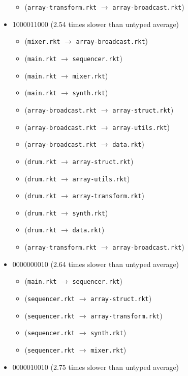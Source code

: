 \documentclass{article}
\newcommand{\mono}[1]{\texttt{#1}}
\begin{document}
\begin{itemize}
\begin{itemize}
  \item (\mono{array-transform.rkt} $\rightarrow$ \mono{array-broadcast.rkt})
  \end{itemize}
\item 1000011000 (2.54 times slower than untyped average)
  \begin{itemize}
  \item (\mono{mixer.rkt} $\rightarrow$ \mono{array-broadcast.rkt})
  \item (\mono{main.rkt} $\rightarrow$ \mono{sequencer.rkt})
  \item (\mono{main.rkt} $\rightarrow$ \mono{mixer.rkt})
  \item (\mono{main.rkt} $\rightarrow$ \mono{synth.rkt})
  \item (\mono{array-broadcast.rkt} $\rightarrow$ \mono{array-struct.rkt})
  \item (\mono{array-broadcast.rkt} $\rightarrow$ \mono{array-utils.rkt})
  \item (\mono{array-broadcast.rkt} $\rightarrow$ \mono{data.rkt})
  \item (\mono{drum.rkt} $\rightarrow$ \mono{array-struct.rkt})
  \item (\mono{drum.rkt} $\rightarrow$ \mono{array-utils.rkt})
  \item (\mono{drum.rkt} $\rightarrow$ \mono{array-transform.rkt})
  \item (\mono{drum.rkt} $\rightarrow$ \mono{synth.rkt})
  \item (\mono{drum.rkt} $\rightarrow$ \mono{data.rkt})
  \item (\mono{array-transform.rkt} $\rightarrow$ \mono{array-broadcast.rkt})
  \end{itemize}
\item 0000000010 (2.64 times slower than untyped average)
  \begin{itemize}
  \item (\mono{main.rkt} $\rightarrow$ \mono{sequencer.rkt})
  \item (\mono{sequencer.rkt} $\rightarrow$ \mono{array-struct.rkt})
  \item (\mono{sequencer.rkt} $\rightarrow$ \mono{array-transform.rkt})
  \item (\mono{sequencer.rkt} $\rightarrow$ \mono{synth.rkt})
  \item (\mono{sequencer.rkt} $\rightarrow$ \mono{mixer.rkt})
  \end{itemize}
\item 0000010010 (2.75 times slower than untyped average)
  \begin{itemize}

\end{itemize}
\end{itemize}
\end{document}
